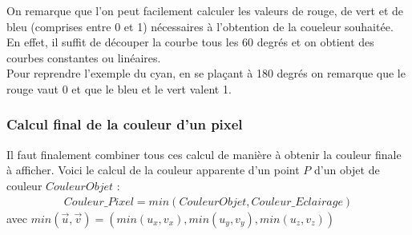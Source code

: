 On remarque que l'on peut facilement calculer les valeurs de rouge, de vert et de bleu (comprises entre 0 et 1) nécessaires à l'obtention de la coueleur souhaitée.\\
En effet, il suffit de découper la courbe tous les 60 degrés et on obtient des courbes constantes ou linéaires.\\
Pour reprendre l'exemple du cyan, en se plaçant à 180 degrés on remarque que le rouge vaut 0 et que le bleu et le vert valent 1.


\subsubsection{Calcul final de la couleur d'un pixel}
Il faut finalement combiner tous ces calcul de manière à obtenir la couleur finale à afficher. Voici le calcul de la couleur apparente d'un point $P$ d'un objet de couleur $CouleurObjet$ :
\begin{align*}
    Couleur\_Pixel=min(CouleurObjet,Couleur\_Eclairage)%
\end{align*}
avec $min(\Vec{u},\Vec{v})=(min(u_x,v_x),min(u_y,v_y),min(u_z,v_z))$